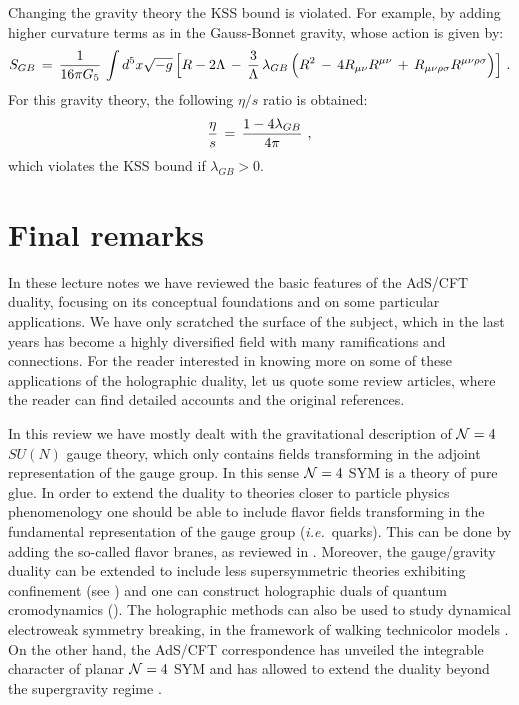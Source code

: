 \documentclass[12pt,notitlepage]{article}
\newcommand{\beq}{\begin{equation}}
\newcommand{\eeq}{\end{equation}}
\def\ie{{\emph{i.e.}}}
\begin{document}
Changing the gravity theory the KSS bound is violated. For example, by adding higher curvature terms as in the Gauss-Bonnet gravity, whose action is given by:
\beq
S_{GB}\,=\,{1\over 16\pi G_5}\,\int d^5x \sqrt{-g}\,\Big[
R-2\Lambda\,-\,{3\over \Lambda}\,\lambda_{GB}\,
\Big(R^2\,-\,4R_{\mu\nu}R^{\mu\nu}\,+\,R_{\mu\nu\rho\sigma}
R^{\mu\nu\rho\sigma}\Big)\Big]\,\,.
\eeq
For this gravity theory,  the following $\eta/s$ ratio is obtained:
\beq
{\eta\over s}\,=\,{1-4\lambda_{GB}\over 4\pi}\,\,,
\eeq
which violates the KSS bound if $\lambda_{GB}>0$. 


\section*{Final remarks}

In these lecture notes we have reviewed the basic features of the AdS/CFT duality, focusing on its conceptual foundations and on some particular applications. We have only scratched the surface of the subject, which  in the last years has become a highly diversified field with many ramifications and connections. For the reader interested in knowing more on some of these applications of the holographic duality, let us quote some review articles, where the reader can find detailed accounts and the original references.  

In this review we have mostly dealt with the gravitational description of 
${\cal N}=4$ $SU(N)$ gauge theory, which only contains fields transforming in the adjoint representation of the gauge group. In this sense ${\cal N}=4$ SYM is a theory of pure glue. In order to extend the duality to theories closer to particle physics phenomenology one should be able to include flavor fields transforming in the fundamental representation of the gauge group (\ie\ quarks). This can be done by adding the so-called flavor branes, as reviewed  in \cite{CasalderreySolana:2011us,Erdmenger:2007cm}.  Moreover, the gauge/gravity duality can be extended to include less supersymmetric theories exhibiting confinement (see \cite{Edelstein:2006kw}) and one can construct holographic duals of quantum cromodynamics (\cite{CasalderreySolana:2011us,Kim:2012ey,Peeters:2007ab,Mateos:2007ay}). The holographic methods can also be used to study dynamical electroweak symmetry breaking, in the framework of walking technicolor models \cite{Piai:2010ma}. On the other hand, the AdS/CFT correspondence has unveiled the integrable character of planar ${\cal N}=4$ SYM and has allowed to extend the duality beyond the supergravity regime \cite{Beisert:2010jr}. 
\end{document}

